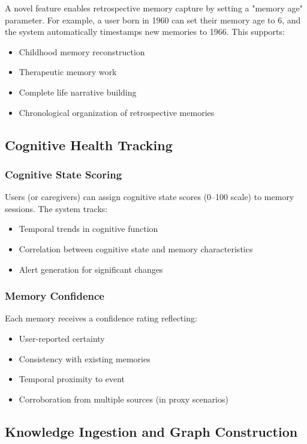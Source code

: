 \documentclass[11pt,letterpaper]{article}
\begin{document}
A novel feature enables retrospective memory capture by setting a "memory age" parameter. For example, a user born in 1960 can set their memory age to 6, and the system automatically timestamps new memories to 1966. This supports:

\begin{itemize}
\item Childhood memory reconstruction
\item Therapeutic memory work
\item Complete life narrative building
\item Chronological organization of retrospective memories
\end{itemize}

\subsection{Cognitive Health Tracking}

\subsubsection{Cognitive State Scoring}

Users (or caregivers) can assign cognitive state scores (0--100 scale) to memory sessions. The system tracks:
\begin{itemize}
\item Temporal trends in cognitive function
\item Correlation between cognitive state and memory characteristics
\item Alert generation for significant changes
\end{itemize}

\subsubsection{Memory Confidence}

Each memory receives a confidence rating reflecting:
\begin{itemize}
\item User-reported certainty
\item Consistency with existing memories
\item Temporal proximity to event
\item Corroboration from multiple sources (in proxy scenarios)
\end{itemize}

\subsection{Knowledge Ingestion and Graph Construction}
\end{document}
